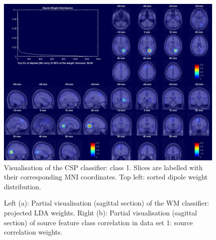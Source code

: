 \begin{figure}[t]
    \centering
    \includegraphics[width=\textwidth]{figures/visualisation-result_CSP_class2.png}
    \caption{Visualisation of the CSP classifier: class 1. Slices are labelled with their corresponding MNI coordinates. Top left: sorted dipole weight distribution.}
    \label{fig:visualisation:csp2}
\end{figure}


\begin{figure}[t]
    \centering
    \qquad
    \caption{Left (a): Partial visualisation (sagittal section) of the WM classifier: projected LDA weights. Right (b): Partial visualisation (sagittal section) of source feature class correlation in data set 1: source correlation weights.}
    \label{fig:visualisation:erpldacorr}
\end{figure}


